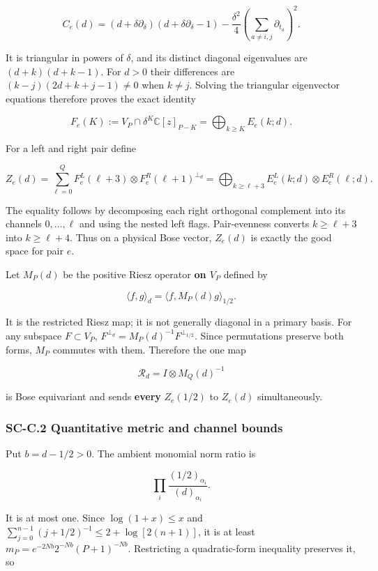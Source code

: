 \[
C_e(d)=(d+\delta\partial_\delta)(d+\delta\partial_\delta-1)
-\frac{\delta^2}{4}\left(\sum_{a\ne i,j}\partial_{t_a}\right)^2.
\]

It is triangular in powers of \(\delta\), and its distinct diagonal eigenvalues are \((d+k)(d+k-1)\). For \(d>0\) their differences are \((k-j)(2d+k+j-1)\ne0\) when \(k\ne j\). Solving the triangular eigenvector equations therefore proves the exact identity

\[
F_e(K):=V_P\cap\delta^K\mathbb C[z]_{P-K}
=\bigoplus_{k\geq K}E_e(k;d).
\]

For a left and right pair define

\[
Z_e(d)=\sum_{\ell=0}^{Q}
F_e^L(\ell+3)\otimes F_e^R(\ell+1)^{\perp_d}
=\bigoplus_{k\geq\ell+3}E_e^L(k;d)\otimes E_e^R(\ell;d).
\]

The equality follows by decomposing each right orthogonal complement into its channels \(0,\ldots,\ell\) and using the nested left flags. Pair-evenness converts \(k\geq\ell+3\) into \(k\geq\ell+4\). Thus on a physical Bose vector, \(Z_e(d)\) is exactly the good space for pair \(e\).

Let \(M_P(d)\) be the positive Riesz operator \textbf{on \(V_P\)} defined by

\[
\langle f,g\rangle_d=\langle f,M_P(d)g\rangle_{1/2}.
\]

It is the restricted Riesz map; it is not generally diagonal in a primary basis. For any subspace \(F\subset V_P\), \(F^{\perp_d}=M_P(d)^{-1}F^{\perp_{1/2}}\). Since permutations preserve both forms, \(M_P\) commutes with them. Therefore the one map

\[
\mathcal R_d=I\otimes M_Q(d)^{-1}
\]

is Bose equivariant and sends \textbf{every} \(Z_e(1/2)\) to \(Z_e(d)\) simultaneously.

\hypertarget{sc-c.2-quantitative-metric-and-channel-bounds}{%
\subsubsection{SC-C.2 Quantitative metric and channel bounds}\label{sc-c.2-quantitative-metric-and-channel-bounds}}

Put \(b=d-1/2>0\). The ambient monomial norm ratio is

\[
\prod_i\frac{(1/2)_{\alpha_i}}{(d)_{\alpha_i}}.
\]

It is at most one. Since \(\log(1+x)\leq x\) and \(\sum_{j=0}^{n-1}(j+1/2)^{-1}\leq2+\log[2(n+1)]\), it is at least \(m_P=e^{-2Nb}2^{-Nb}(P+1)^{-Nb}\). Restricting a quadratic-form inequality preserves it, so


